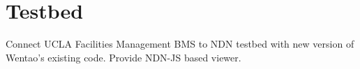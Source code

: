 \section{Testbed}

Connect UCLA Facilities Management BMS to NDN testbed with new version of Wentao’s existing code. Provide NDN-JS based viewer. 
